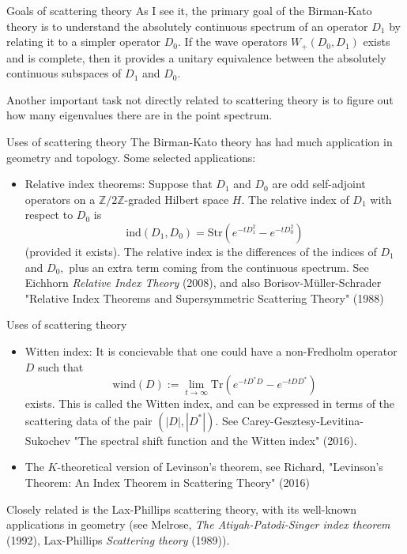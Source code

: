 \documentclass{beamer}
\numberwithin{equation}{section}
\theoremstyle{plain}
\theoremstyle{plain}
\theoremstyle{definition}
\theoremstyle{plain}
\theoremstyle{plain}
\theoremstyle{definition}
\newcommand{\Itgr}{\mathbb{Z}}
\newcommand{\Tr}{\mathrm{Tr}}
\begin{document}
\begin{frame}{Goals of scattering theory}
  As I see it, the primary goal of the Birman-Kato theory is to understand the absolutely continuous spectrum of an operator $D_1$ by relating it to a simpler operator $D_0.$
  If the wave operators $W_{+}(D_0,D_1)$ exists and is complete, then it provides a unitary equivalence between the absolutely continuous subspaces of $D_1$ and $D_0.$

  Another important task not directly related to scattering theory is to figure out how many eigenvalues there are in the point spectrum.
\end{frame}



\begin{frame}{Uses of scattering theory}
The Birman-Kato theory has had much application in geometry and topology. Some selected applications: \pause
\begin{itemize}
\item{} Relative index theorems: Suppose that $D_1$ and $D_0$ are odd self-adjoint operators on a $\Itgr/2\Itgr$-graded Hilbert space $H.$ The relative index of $D_1$ with respect to $D_0$ is
\[
\mathrm{ind}(D_1,D_0) = \mathrm{Str}(e^{-tD_1^2}-e^{-tD_0^2})
\]
(provided it exists). The relative index is the differences of the indices of $D_1$ and $D_0,$ plus an extra term coming from the continuous spectrum. See Eichhorn \emph{Relative Index Theory} (2008), and also Borisov-M\"uller-Schrader "Relative Index Theorems and Supersymmetric Scattering Theory" (1988)
\end{itemize}
\end{frame}


\begin{frame}{Uses of scattering theory}
\begin{itemize}
\item{} Witten index: It is concievable that one could have a non-Fredholm operator $D$ such that
\[
\mathrm{wind}(D) := \lim_{t\to\infty}\Tr(e^{-tD^*D}-e^{-tDD^*})
\]
exists. This is called the Witten index, and can be expressed in terms of the scattering data of the pair $(|D|,|D^*|).$ See Carey-Gesztesy-Levitina-Sukochev "The spectral shift function and the Witten index" (2016).\pause
\item{} The $K$-theoretical version of Levinson's theorem, see Richard, "Levinson’s Theorem: An Index Theorem in Scattering Theory" (2016)\pause
\end{itemize}
Closely related is the Lax-Phillips scattering theory, with its well-known applications in geometry (see Melrose, \emph{The Atiyah-Patodi-Singer index theorem} (1992), Lax-Phillips \emph{Scattering theory} (1989)).

\end{frame}
\end{document}
